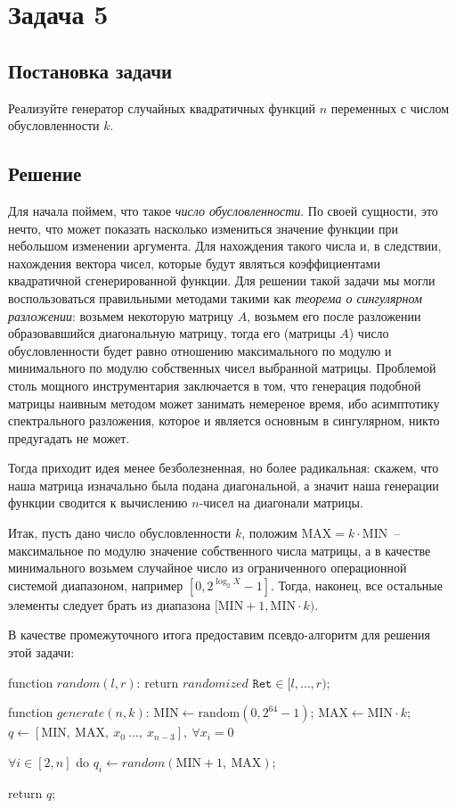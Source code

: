 \documentclass[12pt, a4paper, oneside, final]{article}
\begin{document}
	\section*{Задача 5}
	\subsection*{Постановка задачи}
	Реализуйте генератор случайных квадратичных функций $n$ переменных с числом обусловленности $k$.
	\subsection*{Решение}
	Для начала поймем, что такое \textit{число обусловленности}. По своей сущности, это нечто, что может показать насколько измениться значение функции при небольшом изменении аргумента. Для нахождения такого числа и, в следствии, нахождения вектора чисел, которые будут являться коэффициентами квадратичной сгенерированной функции. Для решении такой задачи мы могли воспользоваться правильными методами такими как \textit{теорема о сингулярном разложении}: возьмем некоторую матрицу $A$, возьмем его после разложении образовавшийся диагональную матрицу, тогда его (матрицы $A$) число обусловленности будет равно отношению максимального по модулю и минимального по модулю собственных чисел выбранной матрицы. Проблемой столь мощного инструментария заключается в том, что генерация подобной матрицы наивным методом может занимать немереное время, ибо асимптотику спектрального разложения, которое и является основным в сингулярном, никто предугадать не может.

	Тогда приходит идея менее безболезненная, но более радикальная: скажем, что наша матрица изначально была подана диагональной, а значит наша генерации функции сводится к вычислению $n$-чисел на диагонали матрицы.

	Итак, пусть дано число обусловленности $k$, положим $\text{MAX} = k \cdot \text{MIN}$~-- максимальное по модулю значение собственного числа матрицы, а в качестве минимального возьмем случайное число из ограниченного операционной системой диапазоном, например $[0, 2^{\log_{2}{X}} - 1]$. Тогда, наконец, все остальные элементы следует брать из диапазона $[\text{MIN} + 1, \text{MIN} \cdot k)$.

	В качестве промежуточного итога предоставим псевдо-алгоритм для решения этой задачи:
	\begin{pseudocode}
function $random(l, r)$:
	return $randomized$ $\mathtt{Ret} \in [l, \ldots, r)$;
		
function $generate(n, k)$:
	$\text{MIN} \gets \text{random}(0, 2^{64} - 1)$;
	$\text{MAX} \gets \text{MIN} \cdot k$;
	$q \gets [\text{MIN},~\text{MAX},~x_{0}~\ldots,~x_{n - 3}], ~ \forall x_{i} = 0$
		
	$\forall i \in [2, n]$ do
		$q_{i} \gets random(\text{MIN} + 1,~\text{MAX})$;
		
	return $q$;
	\end{pseudocode}
	\newpage
\end{document}
